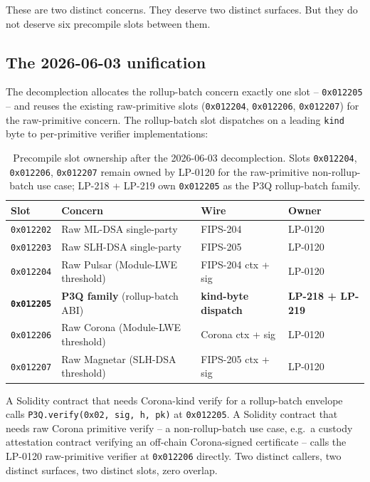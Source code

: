 These are two distinct concerns. They deserve two distinct
surfaces. But they do not deserve six precompile slots between
them.

\subsection{The 2026-06-03 unification}

The decomplection allocates the rollup-batch concern exactly one
slot -- \texttt{0x012205} -- and reuses the existing raw-primitive
slots (\texttt{0x012204}, \texttt{0x012206}, \texttt{0x012207})
for the raw-primitive concern. The rollup-batch slot dispatches
on a leading \texttt{kind} byte to per-primitive verifier
implementations:

\begin{table}[h]
\centering
\small
\begin{tabular}{@{}llll@{}}
\toprule
\textbf{Slot} & \textbf{Concern} & \textbf{Wire} & \textbf{Owner} \\
\midrule
\texttt{0x012202} & Raw ML-DSA single-party & FIPS-204 & LP-0120 \\
\texttt{0x012203} & Raw SLH-DSA single-party & FIPS-205 & LP-0120 \\
\texttt{0x012204} & Raw Pulsar (Module-LWE threshold) & FIPS-204 ctx + sig & LP-0120 \\
\textbf{\texttt{0x012205}} & \textbf{P3Q family} (rollup-batch ABI) & \textbf{kind-byte dispatch} & \textbf{LP-218 + LP-219} \\
\texttt{0x012206} & Raw Corona (Module-LWE threshold) & Corona ctx + sig & LP-0120 \\
\texttt{0x012207} & Raw Magnetar (SLH-DSA threshold) & FIPS-205 ctx + sig & LP-0120 \\
\bottomrule
\end{tabular}
\caption{Precompile slot ownership after the 2026-06-03
decomplection. Slots \texttt{0x012204}, \texttt{0x012206},
\texttt{0x012207} remain owned by LP-0120 for the raw-primitive
non-rollup-batch use case; LP-218 + LP-219 own \texttt{0x012205}
as the P3Q rollup-batch family.}
\label{tab:slot-ownership}
\end{table}

A Solidity contract that needs Corona-kind verify for a
rollup-batch envelope calls
\texttt{P3Q.verify(0x02, sig, h, pk)} at \texttt{0x012205}. A
Solidity contract that needs raw Corona primitive verify -- a
non-rollup-batch use case, e.g.\ a custody attestation contract
verifying an off-chain Corona-signed certificate -- calls the
LP-0120 raw-primitive verifier at \texttt{0x012206} directly. Two
distinct callers, two distinct surfaces, two distinct slots,
zero overlap.

